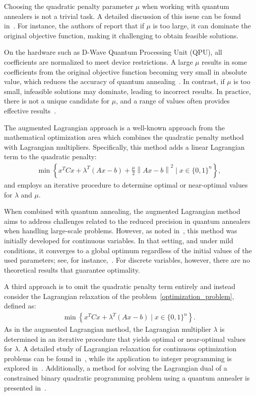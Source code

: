 \documentclass{article}
\begin{document}
Choosing the quadratic penalty parameter $\mu$  when working with quantum annealers is not a trivial task. A detailed discussion of this issue can be found in~\cite{Ayodele2022}. For instance, the authors of \cite{Verma2022} report that if $\mu$ is too large, it can dominate the original objective function, making it challenging to obtain feasible solutions.

On the hardware such as D-Wave Quantum Processing Unit (QPU), all coefficients are normalized to meet device restrictions. A large $\mu$ results in some coefficients from the original objective function becoming very small in absolute value, which reduces the accuracy of quantum annealing~\cite{Djidjev2023}. In contrast, if $\mu$ is too small, infeasible solutions may dominate, leading to incorrect results. In practice, there is not a unique candidate for $\mu$,  and a range of values often provides effective results~\cite{Glover2019}.

The augmented Lagrangian approach is a well-known approach from the mathematical optimization area \cite{Bertsekas} which combines the quadratic penalty method with Lagrangian multipliers. Specifically, this method adds a linear Lagrangian term to the quadratic penalty:
\begin{align*}
\min \left\{ x^T C x + \lambda^T (Ax - b) + \frac{\mu}{2} \left \| Ax - b \right \|^2 \mid x \in \{0, 1\}^n \right\},
\end{align*}
and employs an iterative procedure to determine optimal or near-optimal values for $\lambda$ and $\mu$. 

When combined with quantum annealing, the augmented Lagrangian method aims to address challenges related to the reduced precision in quantum annealers when handling large-scale problems. However, as noted in~\cite{Djidjev2023_2}, this method was initially developed for continuous variables. In that setting, and under mild conditions, it converges to a global optimum regardless of the initial values of the used parameters; see, for instance,~\cite{Bertsekas, Fernandez2012}. For discrete variables, however, there are no theoretical results that guarantee optimality.%

A third approach is to omit the quadratic penalty term entirely and instead consider the Lagrangian relaxation of the problem~\eqref{optimization_problem}, defined as:
\begin{align*}
\min \left\{ x^T C x + \lambda^T (Ax - b)  \mid x \in \{0, 1\}^n \right\}.
\end{align*}
As in the augmented Lagrangian method, the Lagrangian multiplier $\lambda$ is determined in an iterative procedure that yields optimal or near-optimal values for $\lambda$. A detailed study of Lagrangian relaxation for continuous optimization problems can be found in~\cite{Ahuja1993}, while its application to integer programming is explored in~\cite{Fisher2004}. Additionally, a method for solving the Lagrangian dual of a constrained binary quadratic programming problem using a quantum annealer is presented in~\cite{Ronah}.
\end{document}
